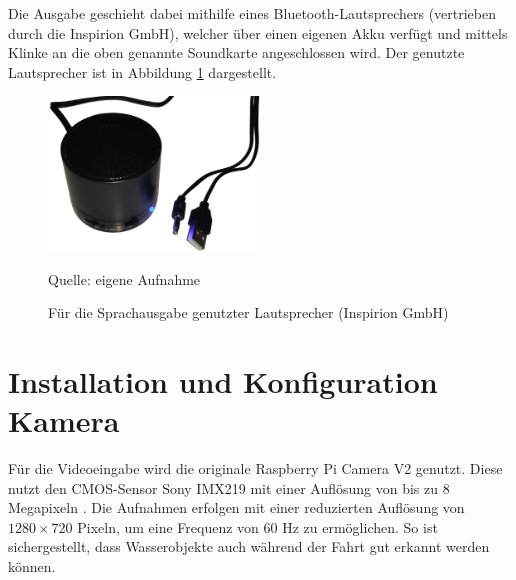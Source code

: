 Die Ausgabe geschieht dabei mithilfe eines Bluetooth-Lautsprechers (vertrieben durch die Inspirion GmbH), welcher über einen eigenen Akku verfügt und mittels Klinke an die oben genannte Soundkarte angeschlossen wird.
Der genutzte Lautsprecher ist in Abbildung \ref{fig:lautsprecher} dargestellt.

\begin{figure}
	\centering
	\includegraphics[width=0.5\textwidth]{../Images/lautsprecher.png}
	\vspace{0.5em}
	\parbox[c]{0.8\linewidth}{\footnotesize
		\centering
		\vspace{1em}
		Quelle: eigene Aufnahme
	}
	\caption{Für die Sprachausgabe genutzter Lautsprecher (Inspirion GmbH)}
	\label{fig:lautsprecher}
\end{figure}

\section{Installation und Konfiguration Kamera}
\label{sec:inst_konf_kamera}

Für die Videoeingabe wird die originale Raspberry Pi Camera V2 genutzt.
Diese nutzt den CMOS-Sensor Sony IMX219 mit einer Auflösung von bis zu 8 Megapixeln \cite{pagnutti2017}.
Die Aufnahmen erfolgen mit einer reduzierten Auflösung von $1280 \times 720$ Pixeln, um eine Frequenz von 60 Hz zu ermöglichen. 
So ist sichergestellt, dass Wasserobjekte auch während der Fahrt gut erkannt werden können.

